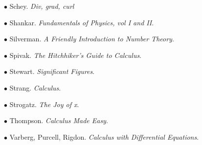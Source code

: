 \documentclass[11pt, oneside]{article}   	%
\begin{document}
$\bullet$ Schey.  \emph{Div, grad, curl}

$\bullet$ Shankar.  \emph{Fundamentals of Physics, vol I and II}.

$\bullet$ Silverman.  \emph{A Friendly Introduction to Number Theory}.

$\bullet$ Spivak.  \emph{The Hitchhiker's Guide to Calculus}.

$\bullet$ Stewart.  \emph{Significant Figures}.

$\bullet$ Strang.  \emph{Calculus}.

$\bullet$ Strogatz.  \emph{The Joy of x}.

$\bullet$ Thompson.  \emph{Calculus Made Easy}.

$\bullet$ Varberg, Purcell, Rigdon.  \emph{Calculus with Differential Equations}.
\end{document}
